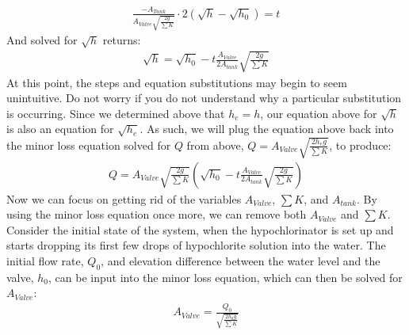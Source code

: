 \documentclass[letterpaper,10pt,english]{sphinxmanual}
\begin{document}
\begin{equation}\label{equation:Flow_Control_and_Measurement/FCM_Derivations:Flow_Control_and_Measurement/FCM_Derivations:5}
\begin{split}\frac{ -A_{Tank}}{A_{Valve} \sqrt{ \frac{2g}{\sum K}} } \cdot 2 \left( \sqrt{h} - \sqrt{h_0} \right) = t\end{split}
\end{equation}
And solved for \(\sqrt{h}\) returns:
\begin{equation}\label{equation:Flow_Control_and_Measurement/FCM_Derivations:Flow_Control_and_Measurement/FCM_Derivations:6}
\begin{split}\sqrt h  = \sqrt{h_0} - t \frac{A_{Valve}}{2 A_{tank}} \sqrt {\frac{2g}{\sum K}}\end{split}
\end{equation}
At this point, the steps and equation substitutions may begin to seem unintuitive. Do not worry if you do not understand why  a particular substitution is occurring. Since we determined above that \(h_e = h\), our equation above for \(\sqrt{h}\) is also an equation for \(\sqrt{h_e}\). As such, we will plug the equation above back into the minor loss equation solved for \(Q\) from above, \(Q = A_{Valve} \sqrt{\frac{2 h_e g}{\sum K}}\), to produce:
\begin{equation}\label{equation:Flow_Control_and_Measurement/FCM_Derivations:Flow_Control_and_Measurement/FCM_Derivations:7}
\begin{split}Q = A_{Valve} \sqrt{\frac{2g}{\sum K}} \left( \sqrt{h_0}  - t \frac{A_{Valve}}{2 A_{tank}} \sqrt{\frac{2g}{\sum K}} \right)\end{split}
\end{equation}
Now we can focus on getting rid of the variables \(A_{Valve}\), \(\sum K\), and \(A_{tank}\). By using the minor loss equation once more, we can remove both \(A_{Valve}\) and \(\sum K\). Consider the initial state of the system, when the hypochlorinator is set up and starts dropping its first few drops of hypochlorite solution into the water. The initial flow rate, \(Q_0\), and elevation difference between the water level and the valve, \(h_0\), can be input into the minor loss equation, which can then be solved for \(A_{Valve}\):
\begin{equation}\label{equation:Flow_Control_and_Measurement/FCM_Derivations:Flow_Control_and_Measurement/FCM_Derivations:8}
\begin{split}A_{Valve} = \frac{Q_{0}}{ \sqrt{ \frac{2 h_0 g}{\sum K}} }\end{split}
\end{equation}
\end{document}
